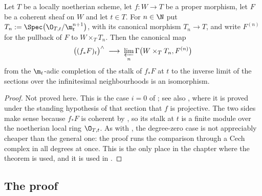 \begin{proposition}
\label{prop:cube-formal-functions}
Let $T$ be a locally noetherian scheme, let $f\colon W\to T$ be a proper morphism, let
$F$ be a coherent sheaf on $W$ and let $t\in T$.  For $n\in\N$ put
$T_n:=\Spec\bigl(\O_{T,t}/\m_t^{n+1}\bigr)$, with its canonical morphism
$T_n\to T$, and write $F^{(n)}$ for the pullback of $F$ to $W\times_TT_n$.
Then the canonical map
\[
  \bigl((f_*F)_t\bigr)^{\wedge}\;\longrightarrow\;
  \varprojlim_n\Gamma\bigl(W\times_TT_n,F^{(n)}\bigr)
\]
from the $\m_t$-adic completion of the stalk of $f_*F$ at $t$ to the inverse
limit of the sections over the infinitesimal neighbourhoods is an isomorphism.
\end{proposition}
\begin{proof}
Not proved here.  This is the case $i=0$ of ; see also
\cite[III, Theorem 11.1]{Hartshorne}, where it is proved under the standing
hypothesis of that section that $f$ is projective.  The two sides make sense
because $f_*F$ is coherent by
, so its stalk at $t$ is a finite
module over the noetherian local ring $\O_{T,t}$.  As with
, the degree-zero case is not
appreciably cheaper than the general one: the proof runs the comparison
through a Cech complex in all degrees at once.  This is the only place in the
chapter where the theorem is used, and it is used in
.
\end{proof}

\subsection*{The proof}

